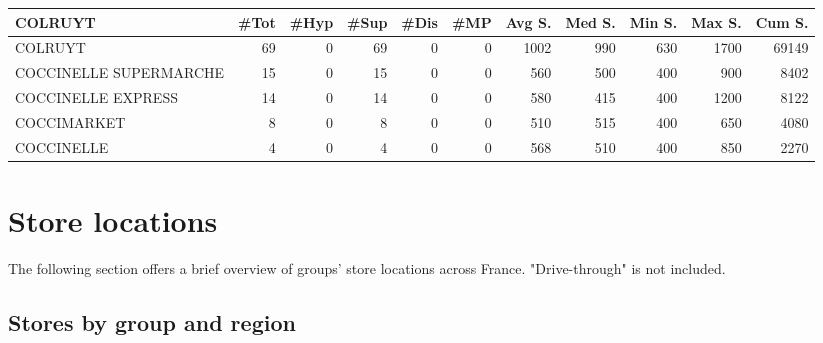 \documentclass[11pt]{article}
\begin{document}
\begin{table}[H]
\footnotesize
\setlength{\tabcolsep}{2pt}
\begin{tabular}{lrrrrrrrrrr}
\toprule
COLRUYT &       \#Tot &       \#Hyp &       \#Sup &       \#Dis &        \#MP &     Avg S. &     Med S. &     Min S. &     Max S. &     Cum S. \\
\midrule
COLRUYT                &         69 &          0 &         69 &          0 &          0 &       1002 &        990 &        630 &       1700 &      69149 \\
COCCINELLE SUPERMARCHE &         15 &          0 &         15 &          0 &          0 &        560 &        500 &        400 &        900 &       8402 \\
COCCINELLE EXPRESS     &         14 &          0 &         14 &          0 &          0 &        580 &        415 &        400 &       1200 &       8122 \\
COCCIMARKET            &          8 &          0 &          8 &          0 &          0 &        510 &        515 &        400 &        650 &       4080 \\
COCCINELLE             &          4 &          0 &          4 &          0 &          0 &        568 &        510 &        400 &        850 &       2270 \\
\bottomrule
\end{tabular}
\end{table}

\section{Store locations}

The following section offers a brief overview of groups' store locations across France. "Drive-through" is not included.

\subsection{Stores by group and region}
\end{document}
